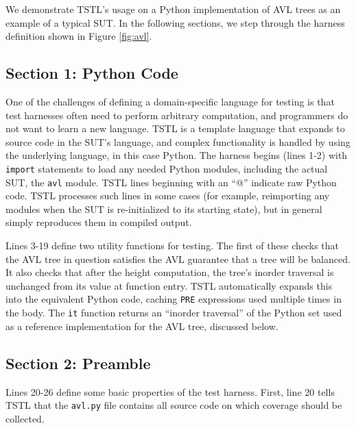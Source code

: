 \documentclass{sig-alternate}
\begin{document}
We demonstrate TSTL's usage on a Python implementation of AVL trees as an example of a typical SUT.  In the following sections, we step through the harness definition shown in Figure \ref{fig:avl}.


\subsection{Section 1: Python Code}

One of the challenges of defining a domain-specific language for
testing is that test harnesses often need to perform arbitrary
computation, and programmers do not want to learn a new language.
TSTL is a template language that expands to source code in the SUT's
language, and complex functionality is handled by using the underlying
language, in this case Python.  The harness begins (lines 1-2) with
{\tt import} statements to load any needed Python modules, including
the actual SUT, the {\tt avl} module.  TSTL lines beginning with an
``@'' indicate raw Python code.  TSTL processes such lines in some
cases (for example, reimporting any modules when the SUT is
re-initialized to its starting state), but in general simply
reproduces them in compiled output.  

Lines 3-19 define two utility functions for testing.  The first of
these checks that the AVL tree in question satisfies the AVL guarantee
that a tree will be balanced. It also checks that after the height
computation, the tree's inorder traversal is unchanged from its value
at function entry.  TSTL automatically expands this into the
equivalent Python code, caching {\tt PRE} expressions used multiple
times in the body.  The {\tt it} function returns an ``inorder
traversal'' of the Python set used as a reference implementation for the AVL
tree, discussed below.

\subsection{Section 2: Preamble}

Lines 20-26 define some basic properties of the test harness.  First,
line 20 tells TSTL that the {\tt avl.py} file contains all source code
on which coverage should be collected.
\end{document}
